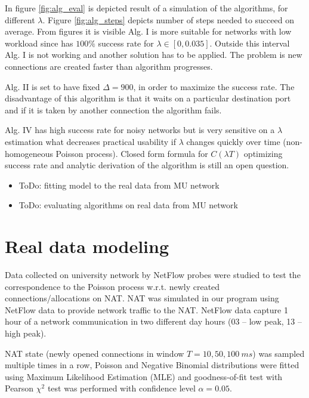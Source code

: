 \documentclass[twoside]{article}
\begin{document}
\begin{multicols}{2}
In figure \ref{fig:alg_eval} is depicted result of a simulation of 
the algorithms, for different $\lambda$. Figure \ref{fig:alg_steps} depicts number of steps needed 
to succeed on average. From figures it is visible Alg. I is more suitable for networks with low 
workload since has $100\%$ success rate for $\lambda \in [0, 0.035]$. Outside this interval 
Alg. I is not working and another solution has to be applied. The problem is new connections are
created faster than algorithm progresses.

Alg. II is set to have fixed $\Delta=900$, in order to maximize the success rate. The disadvantage of this
algorithm is that it waits on a particular destination port and if it is taken by another connection
the algorithm fails. 

Alg. IV has high success rate for 
noisy networks but is very sensitive on a $\lambda$ estimation what decreases practical usability 
if $\lambda$ changes quickly over time (non-homogeneous Poisson process). Closed form formula for $C(\lambda T)$ 
optimizing success rate and analytic derivation of the algorithm is still an open question. 

\begin{itemize}
 \item ToDo: fitting model to the real data from MU network
 \item ToDo: evaluating algorithms on real data from MU network
\end{itemize}

\section{Real data modeling}
Data collected on university network by NetFlow probes were studied to test the correspondence to the Poisson process
w.r.t. newly created connections/allocations on NAT. NAT was simulated in our program using
NetFlow data to provide network traffic to the NAT. NetFlow data capture 1 hour of a network communication in two different
day hours (03 -- low peak, 13 -- high peak).

NAT state (newly opened connections in window $T=10, 50, 100~ms$)
was sampled multiple times in a row, Poisson and Negative Binomial distributions were fitted using Maximum Likelihood Estimation (MLE)
and goodness-of-fit test with Pearson $\chi^2$ test was performed with confidence level $\alpha=0.05$.


\end{multicols}
\end{document}
